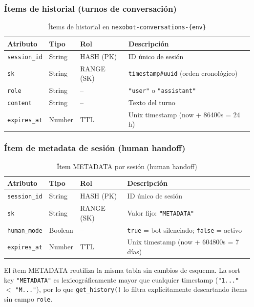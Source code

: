 \documentclass[12pt,a4paper]{article}
\begin{document}
\subsubsection*{Ítems de historial (turnos de conversación)}

\begin{table}[H]
\centering
\begin{tabular}{@{}llll@{}}
\toprule
\textbf{Atributo} & \textbf{Tipo} & \textbf{Rol} & \textbf{Descripción} \\
\midrule
\texttt{session\_id} & String & HASH (PK) & ID único de sesión \\
\texttt{sk} & String & RANGE (SK) & \texttt{timestamp\#uuid} (orden cronológico) \\
\texttt{role} & String & -- & \texttt{"user"} o \texttt{"assistant"} \\
\texttt{content} & String & -- & Texto del turno \\
\texttt{expires\_at} & Number & TTL & Unix timestamp (now + 86400s = 24 h) \\
\bottomrule
\end{tabular}
\caption{Ítems de historial en \texttt{nexobot-conversations-\{env\}}}
\end{table}

\subsubsection*{Ítem de metadata de sesión (human handoff)}

\begin{table}[H]
\centering
\begin{tabular}{@{}llll@{}}
\toprule
\textbf{Atributo} & \textbf{Tipo} & \textbf{Rol} & \textbf{Descripción} \\
\midrule
\texttt{session\_id} & String & HASH (PK) & ID único de sesión \\
\texttt{sk} & String & RANGE (SK) & Valor fijo: \texttt{"METADATA"} \\
\texttt{human\_mode} & Boolean & -- & \texttt{true} = bot silenciado; \texttt{false} = activo \\
\texttt{expires\_at} & Number & TTL & Unix timestamp (now + 604800s = 7 días) \\
\bottomrule
\end{tabular}
\caption{Ítem METADATA por sesión (human handoff)}
\end{table}

\begin{nexobox}
El ítem METADATA reutiliza la misma tabla sin cambios de esquema. La sort key \texttt{"METADATA"}
es lexicográficamente mayor que cualquier timestamp (\texttt{"1..."} $<$ \texttt{"M..."}), por lo que
\texttt{get\_history()} lo filtra explícitamente descartando ítems sin campo \texttt{role}.
\end{nexobox}
\end{document}

